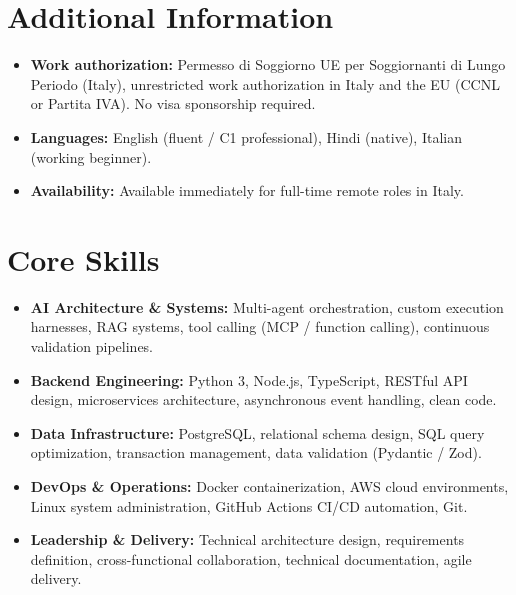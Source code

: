 \documentclass[a4paper,10pt]{article}
\begin{document}
\section{Additional Information}
\begin{itemize}
  \item \textbf{Work authorization:} Permesso di Soggiorno UE per Soggiornanti di Lungo Periodo (Italy), unrestricted work authorization in Italy and the EU (CCNL or Partita IVA). No visa sponsorship required.
  \item \textbf{Languages:} English (fluent / C1 professional), Hindi (native), Italian (working beginner).
  \item \textbf{Availability:} Available immediately for full-time remote roles in Italy.
\end{itemize}

\section{Core Skills}
\begin{itemize}
  \item \textbf{AI Architecture \& Systems:} Multi-agent orchestration, custom execution harnesses, RAG systems, tool calling (MCP / function calling), continuous validation pipelines.
  \item \textbf{Backend Engineering:} Python 3, Node.js, TypeScript, RESTful API design, microservices architecture, asynchronous event handling, clean code.
  \item \textbf{Data Infrastructure:} PostgreSQL, relational schema design, SQL query optimization, transaction management, data validation (Pydantic / Zod).
  \item \textbf{DevOps \& Operations:} Docker containerization, AWS cloud environments, Linux system administration, GitHub Actions CI/CD automation, Git.
  \item \textbf{Leadership \& Delivery:} Technical architecture design, requirements definition, cross-functional collaboration, technical documentation, agile delivery.
\end{itemize}
\end{document}
